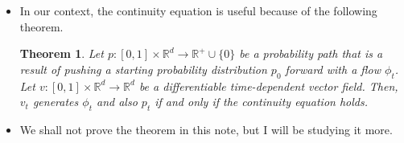 \documentclass[10pt]{article}
\newtheorem{theorem}[lemma]{Theorem}
\newcommand{\dee}{\mathrm{d}}
\newcommand{\ra}{\rightarrow}
\newcommand{\Real}{\mathbb{R}}
\begin{document}
\begin{itemize}
  \item In our context, the continuity equation is useful because of the following theorem.
  \begin{theorem} \label{thm:continuity-equation}
    Let $p: [0,1] \times \Real^d \rightarrow \Real^+ \cup \{0\}$ be a probability path that is a result of pushing a starting probability distribution $p_0$ forward with a flow $\phi_t$. Let $v: [0,1] \times \Real^d \ra \Real^d$ be a differentiable time-dependent vector field. Then, $v_t$ generates $\phi_t$ and also $p_t$ if and only if the continuity equation holds.
  \end{theorem}

  \item We shall not prove the theorem in this note, but I will be studying it more.
  
\begin{comment}
  \item Let $h: \Real^d \rightarrow \Real$ be any compactly supported differentiable function. Consider the time derivative of the following expectation
  \begin{align*}
    \frac{\partial}{\partial t} E_{x \sim p_0} [h(\phi_t(x))]
  \end{align*}
  where $\phi: [0,1] \times \Real^d \ra \Real^d$ is the flow generated by $v_t$. We have that
  \begin{align*}
    \frac{\partial}{\partial t} E_{x \sim p_0} [h(\phi_t(x))]
    &= \frac{\partial}{\partial t} \int p_0(x) h(\phi_t(x)) \, \dee x \\
    &= \int p_0(x) \frac{\partial}{\partial t} h(\phi_t(x)) \, \dee x \\
    &= \int p_0(x) \bigg( \sum_{i=1}^d \nabla_i h(\phi_t(x)) \nabla_1 \phi^i_t(x) \bigg) \, \dee x \\
    &= \int p_0(x) \bigg( \sum_{i=1}^d \nabla_i h(\phi_t(x)) v_t^i(\phi_t(x)) \bigg) \, \dee x \\
  \end{align*}
\end{comment}

\end{itemize}



  
\end{document}
